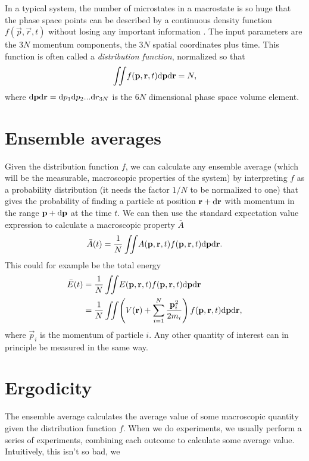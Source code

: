 In a typical system, the number of microstates in a macrostate is so huge that the phase space points can be described by a continuous density function $f(\vec p, \vec r, t)$ without losing any important information \cite{mcquarrie1973statistical}. The input parameters are the $3N$ momentum components, the $3N$ spatial coordinates plus time. This function is often called a \textit{distribution function}, normalized so that
\begin{align}
	\iint\! f(\mathbf p, \mathbf r, t) \mathrm{d}\mathbf p\mathrm{d}\mathbf r = N,
\end{align}
where $\mathrm{d}\mathbf p\mathrm{d}\mathbf r=\mathrm{d}p_1\mathrm{d}p_2...\mathrm{d}r_{3N}$ is the $6N$ dimensional phase space volume element. 

\section{Ensemble averages}
\label{sec:kinetic_theory_ensemble_averages}
Given the distribution function $f$, we can calculate any ensemble average (which will be the measurable, macroscopic properties of the system) by interpreting $f$ as a probability distribution (it needs the factor $1/N$ to be normalized to one) that gives the probability of finding a particle at position $\mathbf r + \mathrm{d}\mathbf r$ with momentum in the range $\mathbf p + \mathrm{d}\mathbf p$ at the time $t$. We can then use the standard expectation value expression to calculate a macroscopic property $\bar A$
\begin{align}
	\bar A(t) = \frac{1}{ N}\iint\! A(\mathbf p, \mathbf r, t)f(\mathbf p, \mathbf r, t)\mathrm{d}\mathbf p\mathrm{d}\mathbf r.
\end{align}
This could for example be the total energy
\begin{align}
	\bar E(t) &= \frac{1}{ N}\iint\! E(\mathbf p, \mathbf r, t)f(\mathbf p, \mathbf r, t)\mathrm{d}\mathbf p\mathrm{d}\mathbf r \\
	&= \frac{1}{ N}\iint\! \left(V(\mathbf r) + \sum_{i=1}^N \frac{\mathbf p_i^2}{2m_i} \right)f(\mathbf p, \mathbf r, t)\mathrm{d}\mathbf p \mathrm{d}\mathbf r,
\end{align}
where $\vec p_i$ is the momentum of particle $i$. Any other quantity of interest can in principle be measured in the same way. 
\section{Ergodicity}
\label{sec:kinetic_theory_ergodicity}
The ensemble average calculates the average value of some macroscopic quantity given the distribution function $f$. When we do experiments, we usually perform a series of experiments, combining each outcome to calculate some average value. Intuitively, this isn't so bad, we 